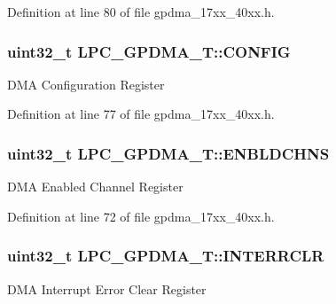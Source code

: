 Definition at line 80 of file gpdma\+\_\+17xx\+\_\+40xx.\+h.

\subsubsection[{\texorpdfstring{C\+O\+N\+F\+IG}{CONFIG}}]{ uint32\+\_\+t L\+P\+C\+\_\+\+G\+P\+D\+M\+A\+\_\+\+T\+::\+C\+O\+N\+F\+IG}\hypertarget{structLPC__GPDMA__T_a059b4997225adef9a773dca681a4b676}{}\label{structLPC__GPDMA__T_a059b4997225adef9a773dca681a4b676}
D\+MA Configuration Register 

Definition at line 77 of file gpdma\+\_\+17xx\+\_\+40xx.\+h.

\subsubsection[{\texorpdfstring{E\+N\+B\+L\+D\+C\+H\+NS}{ENBLDCHNS}}]{ uint32\+\_\+t L\+P\+C\+\_\+\+G\+P\+D\+M\+A\+\_\+\+T\+::\+E\+N\+B\+L\+D\+C\+H\+NS}\hypertarget{structLPC__GPDMA__T_aa35d28a63f29b0e098d8e40dc294049a}{}\label{structLPC__GPDMA__T_aa35d28a63f29b0e098d8e40dc294049a}
D\+MA Enabled Channel Register 

Definition at line 72 of file gpdma\+\_\+17xx\+\_\+40xx.\+h.

\subsubsection[{\texorpdfstring{I\+N\+T\+E\+R\+R\+C\+LR}{INTERRCLR}}]{ uint32\+\_\+t L\+P\+C\+\_\+\+G\+P\+D\+M\+A\+\_\+\+T\+::\+I\+N\+T\+E\+R\+R\+C\+LR}\hypertarget{structLPC__GPDMA__T_ae278f6d236ca389e9aa9a8bcd68ba063}{}\label{structLPC__GPDMA__T_ae278f6d236ca389e9aa9a8bcd68ba063}
D\+MA Interrupt Error Clear Register 

